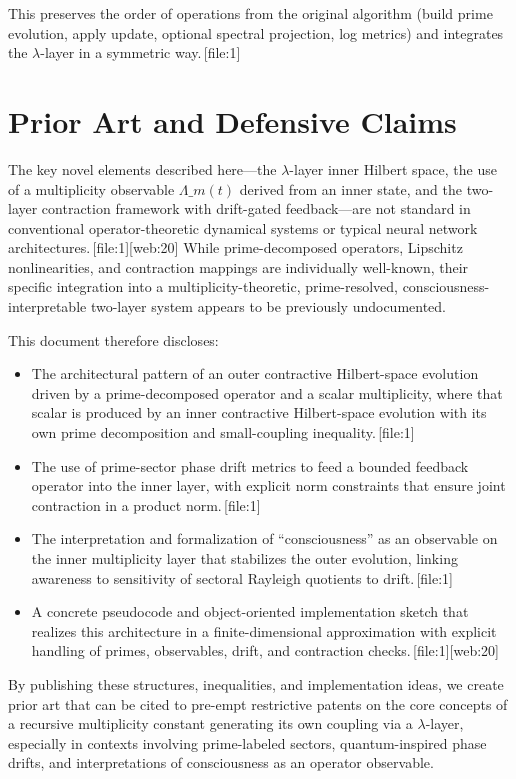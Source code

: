 \documentclass[11pt]{article}
\begin{document}
This preserves the order of operations from the original algorithm (build prime evolution, apply update, optional spectral projection, log metrics) and integrates the $\lambda$-layer in a symmetric way.\,[file:1]

\section{Prior Art and Defensive Claims}

The key novel elements described here---the $\lambda$-layer inner Hilbert space, the use of a multiplicity observable $\Lambda\_m(t)$ derived from an inner state, and the two-layer contraction framework with drift-gated feedback---are not standard in conventional operator-theoretic dynamical systems or typical neural network architectures.\,[file:1][web:20] While prime-decomposed operators, Lipschitz nonlinearities, and contraction mappings are individually well-known, their specific integration into a multiplicity-theoretic, prime-resolved, consciousness-interpretable two-layer system appears to be previously undocumented.

This document therefore discloses:

\begin{itemize}[nosep]
  \item The architectural pattern of an outer contractive Hilbert-space evolution driven by a prime-decomposed operator and a scalar multiplicity, where that scalar is produced by an inner contractive Hilbert-space evolution with its own prime decomposition and small-coupling inequality.\,[file:1]
  \item The use of prime-sector phase drift metrics to feed a bounded feedback operator into the inner layer, with explicit norm constraints that ensure joint contraction in a product norm.\,[file:1]
  \item The interpretation and formalization of ``consciousness'' as an observable on the inner multiplicity layer that stabilizes the outer evolution, linking awareness to sensitivity of sectoral Rayleigh quotients to drift.\,[file:1]
  \item A concrete pseudocode and object-oriented implementation sketch that realizes this architecture in a finite-dimensional approximation with explicit handling of primes, observables, drift, and contraction checks.\,[file:1][web:20]
\end{itemize}

By publishing these structures, inequalities, and implementation ideas, we create prior art that can be cited to pre-empt restrictive patents on the core concepts of a recursive multiplicity constant generating its own coupling via a $\lambda$-layer, especially in contexts involving prime-labeled sectors, quantum-inspired phase drifts, and interpretations of consciousness as an operator observable.
\end{document}
